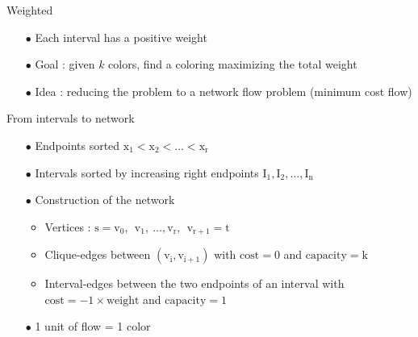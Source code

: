 \begin{frame}{Weighted}
\begin{itemize}
\item[$\bullet$]Each interval has a positive weight
\item[$\bullet$]Goal : given $k$ colors, find a coloring maximizing the total weight
\item[$\bullet$]Idea : reducing the problem to a network flow problem (minimum cost flow)
\end{itemize}
\end{frame}

\begin{frame}{From intervals to network}
\begin{itemize}
\item[$\bullet$]Endpoints sorted $\mathrm{x_{1}<x_{2}<\dots<x_{r}}$
\item[$\bullet$]Intervals sorted by increasing right endpoints $\mathrm{I_{1}, I_{2},\dots,  I_{n}}$
\item[$\bullet$]Construction of the network
    \begin{itemize}
    \item Vertices : $\mathrm{s=v_{0},\ \ v_{1},\ \dots, v_{r},\ \ v_{r+1}=t}$
    \item Clique-edges between $\mathrm{(v_{i},v_{i+1})}$ with $\mathrm{cost = 0}$ and $\mathrm{capacity = k}$
    \item Interval-edges between the two endpoints of an interval with $\mathrm{cost = -1 \times weight}$ and $\mathrm{capacity = 1}$
    \end{itemize}
\item[$\bullet$]1 unit of flow = 1 color
\end{itemize}
\end{frame}

